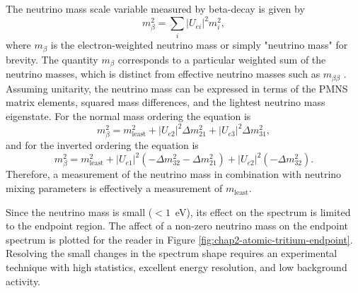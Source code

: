 The neutrino mass scale variable measured by beta-decay is given by 
\begin{equation}
    m_\beta^2=\sum_i{|U_{ei}|^2}m_i^2,
\end{equation}
where $m_\beta$ is the electron-weighted neutrino mass or simply "neutrino mass" for brevity. The quantity $m_\beta$ corresponds to a particular weighted sum of the neutrino masses, which is distinct from effective neutrino masses such as $m_{\beta\beta}$ \cite{FORMAGGIO20211}. Assuming unitarity, the neutrino mass can be expressed in terms of the PMNS matrix elements, squared mass differences, and the lightest neutrino mass eigenstate. For the normal mass ordering the equation is
\begin{equation}
    m_\beta^2=m^2_\textrm{least} + |U_{e2}|^2\Delta m_{21}^2 +|U_{e3}|^2\Delta m_{31}^2,
\end{equation} 
and for the inverted ordering the equation is 
\begin{equation}
    m_\beta^2=m^2_\textrm{least}+|U_{e1}|^2(-\Delta m_{32}^2-\Delta m_{21}^2)+|U_{e2}|^2(-\Delta m_{32}^2).
\end{equation}
Therefore, a measurement of the neutrino mass in combination with neutrino mixing parameters is effectively a measurement of $m_\textrm{least}$.

Since the neutrino mass is small ($<1$~eV), its effect on the spectrum is limited to the endpoint region. The affect of a non-zero neutrino mass on the endpoint spectrum is plotted for the reader in Figure \ref{fig:chap2-atomic-tritium-endpoint}. Resolving the small changes in the spectrum shape requires an experimental technique with high statistics, excellent energy resolution, and low background activity. 

